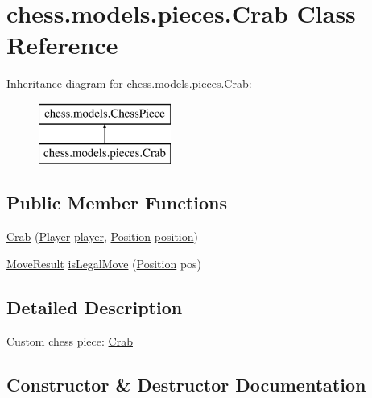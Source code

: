 \hypertarget{classchess_1_1models_1_1pieces_1_1_crab}{}\section{chess.\+models.\+pieces.\+Crab Class Reference}
\label{classchess_1_1models_1_1pieces_1_1_crab}
Inheritance diagram for chess.\+models.\+pieces.\+Crab\+:\begin{figure}[H]
\begin{center}
\leavevmode
\includegraphics[height=2.000000cm]{classchess_1_1models_1_1pieces_1_1_crab}
\end{center}
\end{figure}
\subsection*{Public Member Functions}
\begin{DoxyCompactItemize}
\item 
\mbox{\hyperlink{classchess_1_1models_1_1pieces_1_1_crab_a7edb6f44e813e0f5a80429b9332606d2}{Crab}} (\mbox{\hyperlink{enumchess_1_1models_1_1enums_1_1_player}{Player}} \mbox{\hyperlink{classchess_1_1models_1_1_chess_piece_a3bcc8a24667318b5aab8c146adcc3eb7}{player}}, \mbox{\hyperlink{classchess_1_1models_1_1_position}{Position}} \mbox{\hyperlink{classchess_1_1models_1_1_chess_piece_a0e4f8616b75e548f269d3971846396f3}{position}})
\item 
\mbox{\hyperlink{enumchess_1_1models_1_1enums_1_1_move_result}{Move\+Result}} \mbox{\hyperlink{classchess_1_1models_1_1pieces_1_1_crab_a391e322738ac0974c9ef4a26af1a7de2}{is\+Legal\+Move}} (\mbox{\hyperlink{classchess_1_1models_1_1_position}{Position}} pos)
\end{DoxyCompactItemize}


\subsection{Detailed Description}
Custom chess piece\+: \mbox{\hyperlink{classchess_1_1models_1_1pieces_1_1_crab}{Crab}} 

\subsection{Constructor \& Destructor Documentation}
\mbox{\label{classchess_1_1models_1_1pieces_1_1_crab_a7edb6f44e813e0f5a80429b9332606d2}} 
